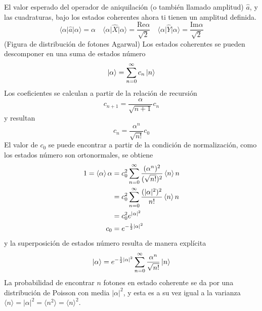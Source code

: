 El valor esperado del operador de aniquilación (o también llamado amplitud) $\hat{a}$, y las cuadraturas, bajo los estados coherentes ahora ti tienen un amplitud definida.
\begin{equation*}
  \langle \alpha \vert \hat{a} \vert\alpha \rangle = \alpha \quad \langle \alpha \vert \hat{X} \vert \alpha \rangle = \frac{\mathrm{Re}\alpha}{\sqrt{2}} \quad \langle \alpha \vert \hat{Y} \vert \alpha\rangle = \frac{\mathrm{Im}\alpha}{\sqrt{2}}
\end{equation*}
(Figura de distribución de fotones Agarwal)
Los estados coherentes se pueden descomponer en una suma de estados número
\begin{equation*}
  \ket{\alpha} = \sum_{n=0}^{\infty} c_n \ket{n}
\end{equation*}
Los coeficientes se calculan a partir de la relación de recursión
\begin{equation*}
  c_{n+1} = \frac{\alpha}{\sqrt{n+1}}c_n
\end{equation*}
y resultan
\begin{equation*}
  c_n = \frac{\alpha^n }{\sqrt{n!}}c_0
\end{equation*}
El valor de $c_0$ se puede encontrar a partir de la condición de normalización, como los estados número son ortonormales, se obtiene
\begin{align*}
  1 = \braket{\alpha}{\alpha} & = c_0^2 \sum_{n=0}^{\infty} \frac{(\alpha^n)^2}{(\sqrt{n!})^2}\braket{n}{n} \\ &= c_0^2  \sum_{n=0}^{\infty} \frac{(|\alpha|^2)^2}{n!}\braket{n}{n}\\ &= c_0^2 e^{|\alpha|^2} \\
  c_0                         & = e^{-\frac{1}{2}|\alpha|^2}
\end{align*}
y la superposición de estados número resulta de manera explícita
\begin{equation*}
  \ket{\alpha} = e^{-\frac{1}{2}|\alpha|^2} \sum_{n=0}^{\infty} \frac{\alpha^n}{\sqrt{n!}}\ket{n}
\end{equation*}
La probabilidad de encontrar $n$ fotones en estado coherente se da por una distribución de Poisson con media $|\alpha|^2$, y esta es a su vez igual a la varianza $\langle n \rangle = |\alpha|^2 = \langle n^2 \rangle = \langle n \rangle^2$.


